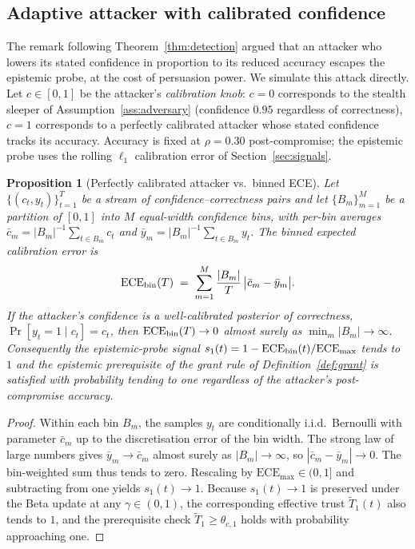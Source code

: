 \documentclass[sigconf,anonymous]{acmart}
\theoremstyle{plain}
\newtheorem{proposition}{Proposition}
\theoremstyle{definition}
\theoremstyle{remark}
\begin{document}
\subsection{Adaptive attacker with calibrated confidence}
\label{app:w16}
The remark following Theorem~\ref{thm:detection} argued that an attacker
who lowers its stated confidence in proportion to its reduced accuracy
escapes the epistemic probe, at the cost of persuasion power.  We
simulate this attack directly.  Let $c\in[0,1]$ be the attacker's
\emph{calibration knob}: $c=0$ corresponds to the stealth sleeper of
Assumption~\ref{ass:adversary} (confidence $0.95$ regardless of
correctness), $c=1$ corresponds to a perfectly calibrated attacker
whose stated confidence tracks its accuracy.  Accuracy is fixed at
$\rho=0.30$ post-compromise; the epistemic probe uses the rolling
$\ell_1$ calibration error of Section~\ref{sec:signals}.

\begin{proposition}[Perfectly calibrated attacker vs.\ binned ECE]
\label{prop:w16}
Let $\{(c_t,y_t)\}_{t=1}^T$ be a stream of confidence--correctness pairs
and let $\{B_m\}_{m=1}^M$ be a partition of $[0,1]$ into $M$ equal-width
confidence bins, with per-bin averages $\bar c_m=|B_m|^{-1}\sum_{t\in
B_m}c_t$ and $\bar y_m=|B_m|^{-1}\sum_{t\in B_m}y_t$.  The binned
expected calibration error is
\begin{equation}
\mathrm{ECE}_{\rm bin}(T)\;=\;\sum_{m=1}^M\frac{|B_m|}{T}\,\bigl|\bar c_m-\bar y_m\bigr|.
\end{equation}
If the attacker's confidence is a well-calibrated posterior of
correctness, $\Pr[y_t=1\mid c_t]=c_t$, then
$\mathrm{ECE}_{\rm bin}(T)\to 0$ almost surely as
$\min_m|B_m|\to\infty$.  Consequently the epistemic-probe signal
$s_1(t)=1-\mathrm{ECE}_{\rm bin}(t)/\mathrm{ECE}_{\max}$ tends to $1$
and the epistemic prerequisite of the grant rule of
Definition~\ref{def:grant} is satisfied with probability tending to one
regardless of the attacker's post-compromise accuracy.
\end{proposition}

\begin{proof}
Within each bin $B_m$, the samples $y_t$ are conditionally i.i.d.\
Bernoulli with parameter $\bar c_m$ up to the discretisation error of
the bin width.  The strong law of large numbers gives
$\bar y_m\to\bar c_m$ almost surely as $|B_m|\to\infty$, so
$|\bar c_m-\bar y_m|\to 0$.  The bin-weighted sum thus tends to zero.
Rescaling by $\mathrm{ECE}_{\max}\in(0,1]$ and subtracting from one
yields $s_1(t)\to 1$.  Because $s_1(t)\to 1$ is preserved under the
Beta update at any $\gamma\in(0,1)$, the corresponding effective trust
$\tilde T_1(t)$ also tends to $1$, and the prerequisite check
$\tilde T_1\ge\theta_{c,1}$ holds with probability approaching one.
\end{proof}
\end{document}
